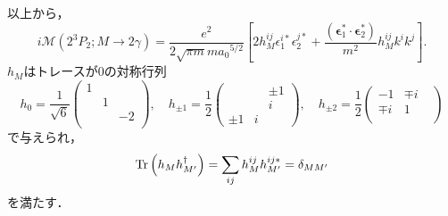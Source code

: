 以上から，
\[
i\mathcal{M}(2^3P_2;M \to 2\gamma) = \frac{e^2}{2\sqrt{\pi m}m a_0{}^{5/2}} \left[ 2h_M^{ij} \epsilon_1^{i\ast} \epsilon_2^{j\ast}
+ \frac{(\boldsymbol{\epsilon}_1^\ast \cdot \boldsymbol{\epsilon}_2^\ast)}{m^2} h_M^{ij} k^ik^j \right] .
\]
$h_M$はトレースが$0$の対称行列
\[
h_0 = \frac{1}{\sqrt{6}}
\begin{pmatrix}
  1 & & \\
  & 1 & \\
  & & -2 \\
\end{pmatrix}
, \quad
h_{\pm1} = \frac{1}{2}
\begin{pmatrix}
  & & \pm1 \\
  & & i \\
  \pm1 & i &
\end{pmatrix}
, \quad
h_{\pm2} = \frac{1}{2}
\begin{pmatrix}
  -1 & \mp i & \\
  \mp i & 1 & \\
  & &
\end{pmatrix}
\]
で与えられ，
\begin{align}
  \operatorname{Tr} \left( h_M h_{M'}^\dagger \right) = \sum_{ij} h_M^{ij} h_{M'}^{ij\ast} = \delta_{MM'}
  \label{prob5_4b_h_tens_orth}
\end{align}
を満たす．

